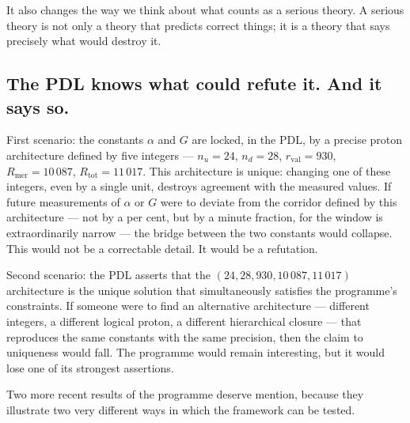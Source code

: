 \documentclass[11pt, a4paper, openright]{book}
\begin{document}
\medskip

It also changes the way we think about what counts as a serious theory. A serious theory is not only a theory that predicts correct things; it is a theory that says precisely what would destroy it.

\subsection*{The PDL knows what could refute it. And it says so.}

First scenario: the constants $\alpha$ and $G$ are locked, in the PDL, by a precise proton architecture defined by five integers — $n_u = 24$, $n_d = 28$, $r_\text{val} = 930$, $R_\text{mer} = 10\,087$, $R_\text{tot} = 11\,017$. This architecture is unique: changing one of these integers, even by a single unit, destroys agreement with the measured values. If future measurements of $\alpha$ or $G$ were to deviate from the corridor defined by this architecture — not by a per cent, but by a minute fraction, for the window is extraordinarily narrow — the bridge between the two constants would collapse. This would not be a correctable detail. It would be a refutation.

\medskip

Second scenario: the PDL asserts that the $(24, 28, 930, 10\,087, 11\,017)$ architecture is the unique solution that simultaneously satisfies the programme’s constraints. If someone were to find an alternative architecture — different integers, a different logical proton, a different hierarchical closure — that reproduces the same constants with the same precision, then the claim to uniqueness would fall. The programme would remain interesting, but it would lose one of its strongest assertions.

\medskip

Two more recent results of the programme deserve mention, because they illustrate two very different ways in which the framework can be tested.
\end{document}
